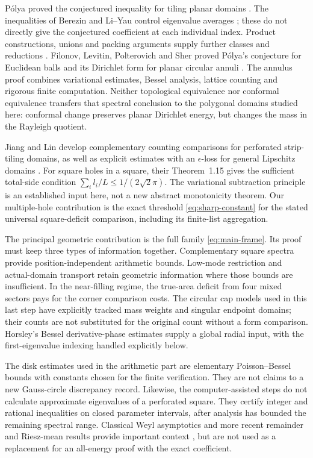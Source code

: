 \documentclass[11pt,reqno]{amsart}
\numberwithin{equation}{section}
\begin{document}
P\'olya proved the conjectured inequality for tiling planar domains
\cite{Polya1961}. The inequalities of Berezin and Li--Yau control
eigenvalue averages \cite{Berezin1972,LiYau1983}; these do not
directly give the conjectured coefficient at each individual index.
Product constructions, unions and packing arguments supply further
classes and reductions \cite{Laptev1997,FLP2021,FS2023,HW2026}.
Filonov, Levitin, Polterovich and Sher proved P\'olya's conjecture
for Euclidean balls \cite{FLPS2023} and its Dirichlet form for
planar circular annuli \cite{FLPS2026}. The annulus proof combines
variational estimates, Bessel analysis, lattice counting and
rigorous finite computation. Neither topological equivalence nor
conformal equivalence transfers that spectral conclusion to the
polygonal domains studied here: conformal change preserves planar
Dirichlet energy, but changes the mass in the Rayleigh quotient.

Jiang and Lin develop complementary counting comparisons for
perforated strip-tiling domains, as well as explicit estimates with
an $\epsilon$-loss for general Lipschitz domains \cite{JL2026}.
For square holes in a square, their Theorem~1.15 gives the
sufficient total-side condition
$\sum_i l_i/L\le1/(2\sqrt2\pi)$. The variational subtraction
principle is an established input here, not a new abstract
monotonicity theorem. Our multiple-hole contribution is the exact
threshold \eqref{eq:sharp-constant} for the stated universal
square-deficit comparison, including its finite-list aggregation.

The principal geometric contribution is the full family
\eqref{eq:main-frame}. Its proof must keep three types of
information together. Complementary square spectra provide
position-independent arithmetic bounds. Low-mode restriction and
actual-domain transport retain geometric information where those
bounds are insufficient. In the near-filling regime, the true-area
deficit from four mixed sectors pays for the corner comparison
costs. The circular cap models used in this last step have
explicitly tracked mass weights and singular endpoint domains;
their counts are not substituted for the original count without
a form comparison. Horsley's Bessel derivative-phase estimates
\cite{Horsley2017} supply a global radial input, with the
first-eigenvalue indexing handled explicitly below.

The disk estimates used in the arithmetic part are elementary
Poisson--Bessel bounds with constants chosen for the finite
verification. They are not claims to a new Gauss-circle discrepancy
record. Likewise, the computer-assisted steps do not calculate
approximate eigenvalues of a perforated square. They certify
integer and rational inequalities on closed parameter intervals,
after analysis has bounded the remaining spectral range.
Classical Weyl asymptotics and more recent remainder and
Riesz-mean results provide important context
\cite{Weyl1912,JL2026,FrankLarson2025}, but are not used as a
replacement for an all-energy proof with the exact coefficient.
\end{document}
